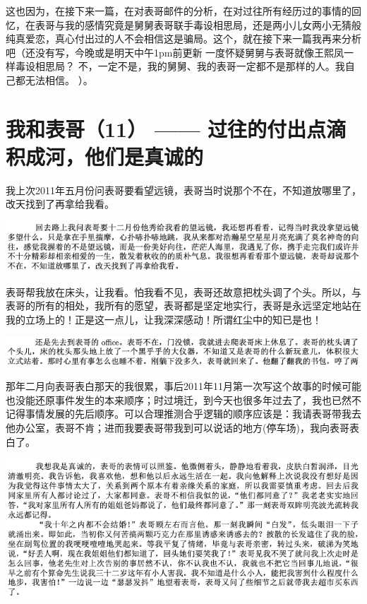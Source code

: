 \documentclass[9pt, b5paper]{article}
\begin{document}
这也因为，在接下来一篇，在对表哥邮件的分析，在对过往所有经历过的事情的回忆，在表哥与我的感情究竟是舅舅表哥联手毒设相思局，还是两小儿女两小无猜般纯真爱恋，真心付出过的人不会相信这是骗局。这个，就在接下来一篇我再来分析吧（还没有写，今晚或是明天中午1pm前更新
一度怀疑舅舅与表哥就像王熙凤一样毒设相思局？
不，一定不是，我的舅舅、我的表哥一定都不是那样的人。我自己都无法相信。 
）。

\section{我和表哥（11） —— 过往的付出点滴积成河，他们是真诚的}
\label{sec:org15ff546}
我上次2011年五月份问表哥要看望远镜，表哥当时说那个不在，不知道放哪里了，改天找到了再拿给我看。 

\begin{center}
\includegraphics[width=.9\linewidth]{./pic/p1p57-2.png}
\end{center}

表哥帮我放在床头，让我看。怕我看不见，表哥还故意把枕头调了个头。所以，与表哥的所有的相处，我所有的愿望，表哥都是坚定地实行，表哥是永远坚定地站在我的立场上的！正是这一点儿，让我深深感动！所谓红尘中的知已是也！

\begin{center}
\includegraphics[width=.9\linewidth]{./pic/p1p67-7.png}
\end{center}

那年二月向表哥表白那天的我很累，事后2011年11月第一次写这个故事的时候可能也没能还原事件发生的本来顺序；时过境迁，到今天也很多年过去了，我也已然不记得事情发展的先后顺序。可以合理推测合乎逻辑的顺序应该是：我请表哥带我去他办公室，表哥不肯；进而我要表哥带我到可以说话的地方(停车场)，我向表哥表白了。

\begin{center}
\includegraphics[width=.9\linewidth]{./pic/p1p50-3.png}
\end{center}
\end{document}
